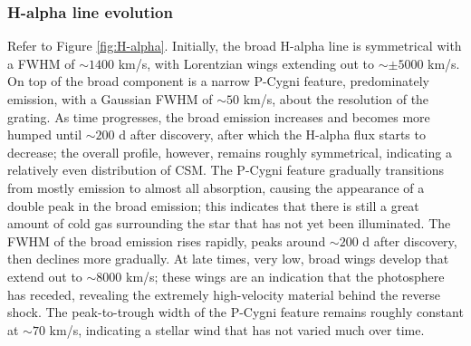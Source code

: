 \documentclass[iop]{emulateapj}
\begin{document}
\subsubsection{H-alpha line evolution}\label{analysis:spec:line}
Refer to Figure \ref{fig:H-alpha}. Initially, the broad H-alpha line is symmetrical with a FWHM of $\sim1400$ km/s, with Lorentzian wings extending out to $\sim\pm5000$ km/s. On top of the broad component is a narrow P-Cygni feature, predominately emission, with a Gaussian FWHM of $\sim50$ km/s, about the resolution of the grating. As time progresses, the broad emission increases and becomes more humped until $\sim200$ d after discovery, after which the H-alpha flux starts to decrease; the overall profile, however, remains roughly symmetrical, indicating a relatively even distribution of CSM. The P-Cygni feature gradually transitions from mostly emission to almost all absorption, causing the appearance of a double peak in the broad emission; this indicates that there is still a great amount of cold gas surrounding the star that has not yet been illuminated. The FWHM of the broad emission rises rapidly, peaks around $\sim200$ d after discovery, then declines more gradually. At late times, very low, broad wings develop that extend out to $\sim 8000$ km/s; these wings are an indication that the photosphere has receded, revealing the extremely high-velocity material behind the reverse shock. The peak-to-trough width of the P-Cygni feature remains roughly constant at $\sim70$ km/s, indicating a stellar wind that has not varied much over time.
\end{document}
